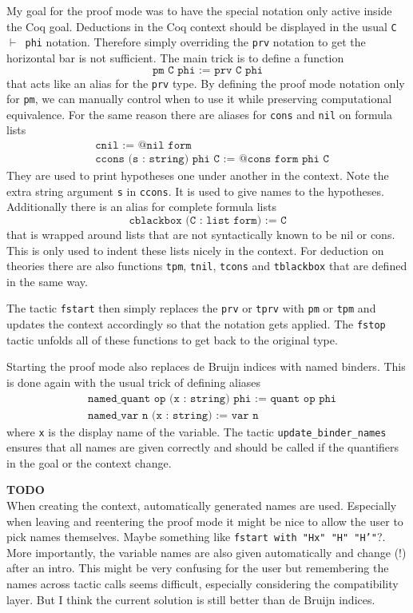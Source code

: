 \documentclass[12pt, a4paper]{article}
\newcommand{\coq}[1]{\texttt{#1}}
\newcommand{\improve}[1]{
	\vspace{3pt}
	\begin{boximprove}
		\parbox{\textwidth}{\textcolor{colorimprove}{\textbf{TODO}\\#1}}
	\end{boximprove}}
\begin{document}
My goal for the proof mode was to have the special notation only active inside the Coq goal.
Deductions in the Coq context should be displayed in the usual \texttt{C $\vdash$ phi} notation.
Therefore simply overriding the \texttt{prv} notation to get the horizontal bar is not sufficient.
The main trick is to define a function
$$\coq{pm C phi := prv C phi}$$
that acts like an alias for the \texttt{prv} type.
By defining the proof mode notation only for \texttt{pm}, we can manually control when to use it while preserving computational equivalence.
For the same reason there are aliases for \texttt{cons} and \texttt{nil} on formula lists
\begin{align*}
	&\coq{cnil := @nil form} \\
	&\coq{ccons (s : string) phi C  := @cons form phi C}
\end{align*}
They are used to print hypotheses one under another in the context.
Note the extra string argument \texttt{s} in \texttt{ccons}.
It is used to give names to the hypotheses.
Additionally there is an alias for complete formula lists
$$\coq{cblackbox (C : list form) := C}$$
that is wrapped around lists that are not syntactically known to be nil or cons.
This is only used to indent these lists nicely in the context.
For deduction on theories there are also functions \texttt{tpm}, \texttt{tnil}, \texttt{tcons} and \texttt{tblackbox} that are defined in the same way.

\medskip\noindent
The tactic \texttt{fstart} then simply replaces the \texttt{prv} or \texttt{tprv} with \texttt{pm} or \texttt{tpm} and updates the context accordingly so that the notation gets applied. The \texttt{fstop} tactic unfolds all of these functions to get back to the original type.

Starting the proof mode also replaces de Bruijn indices with named binders. This is done again with the usual trick of defining aliases
\begin{align*}
	&\coq{named_quant op (x : string) phi := quant op phi} \\
	&\coq{named_var n (x : string) := var n}
\end{align*}
where \texttt{x} is the display name of the variable.
The tactic \texttt{update\_binder\_names} ensures that all names are given correctly and should be called if the quantifiers in the goal or the context change.

\improve{When creating the context, automatically generated names are used. Especially when leaving and reentering the proof mode it might be nice to allow the user to pick names themselves. Maybe something like \texttt{fstart with "Hx" "H" "H'"}?.
\medskip\\
More importantly, the variable names are also given automatically and change (!) after an intro. This might be very confusing for the user but remembering the names across tactic calls seems difficult, especially considering the compatibility layer. But I think the current solution is still better than de Bruijn indices.}
\end{document}
